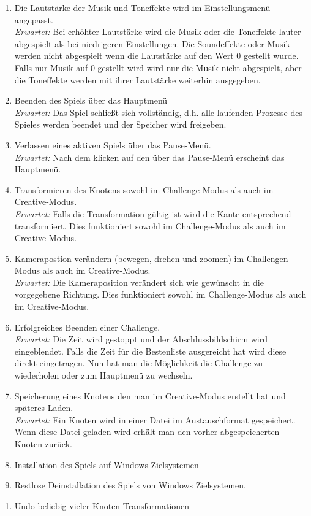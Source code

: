 \begin{enumerate}
\item Die Lautstärke der Musik und Toneffekte wird im Einstellungsmenü angepasst. \\  
\textit{Erwartet:} Bei erhöhter Lautstärke wird die Musik oder die Toneffekte lauter abgespielt als bei niedrigeren Einstellungen. Die Soundeffekte oder Musik werden nicht abgespielt wenn die Lautstärke auf den Wert 0 gestellt wurde. Falls nur Musik auf 0 gestellt wird wird nur die Musik nicht abgespielt, aber die Toneffekte werden mit ihrer Lautstärke weiterhin ausgegeben.
\item Beenden des Spiels über das Hauptmenü\\
\textit{Erwartet:} Das Spiel schließt sich vollständig, d.h. alle laufenden Prozesse des Spieles werden beendet und der Speicher wird freigeben.
\item Verlassen eines aktiven Spiels über das Pause-Menü.\\
\textit{Erwartet:} Nach dem klicken auf den  über das Pause-Menü erscheint das Hauptmenü.
\item Transformieren des Knotens sowohl im Challenge-Modus als auch im Creative-Modus.\\
\textit{Erwartet:} Falls die Transformation gültig ist wird die Kante entsprechend transformiert. Dies funktioniert sowohl im Challenge-Modus als auch im Creative-Modus.
\item Kamerapostion verändern (bewegen, drehen und zoomen) im Challengen-Modus als auch im Creative-Modus.\\
\textit{Erwartet:} Die Kameraposition verändert sich wie gewünscht in die vorgegebene Richtung. Dies funktioniert sowohl im Challenge-Modus als auch im Creative-Modus.
\item Erfolgreiches Beenden einer Challenge. \\
\textit{Erwartet:} Die Zeit wird gestoppt und der Abschlussbildschirm wird eingeblendet. Falls die Zeit für die Bestenliste ausgereicht hat wird diese direkt eingetragen. Nun hat man die Möglichkeit die Challenge zu wiederholen oder zum Hauptmenü zu wechseln.
\item Speicherung eines Knotens den man im Creative-Modus erstellt hat und späteres Laden.\\
\textit{Erwartet:} Ein Knoten wird in einer Datei im Austauschformat gespeichert. Wenn diese Datei geladen wird erhält man den vorher abgespeicherten Knoten zurück.
\item Installation des Spiels auf Windows Zielsystemen
\item Restlose Deinstallation des Spiels von Windows Zielsystemen.

\end{enumerate}

\begin{enumerate}[resume]
\item Undo beliebig vieler Knoten-Transformationen 
\end{enumerate}

